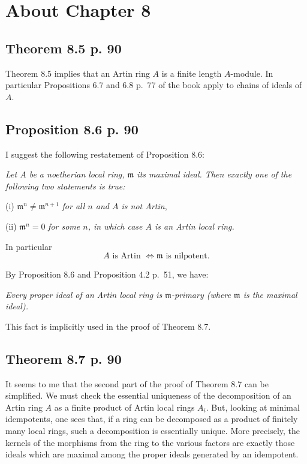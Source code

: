 \documentclass[parskip=half,fontsize=12pt]{scrartcl}%
\newcommand{\mf}{\mathfrak}
\newcommand{\mmm}{\mf m}
\begin{document}
\section{About Chapter 8}%

\subsection{Theorem 8.5 p. 90}\label{8.5}%

Theorem 8.5 implies that an Artin ring $A$ is a finite length $A$-module. In particular Propositions 6.7 and 6.8 p.~77 of the book apply to chains of ideals of $A$.

\subsection{Proposition 8.6 p. 90}\label{8.6}%

I suggest the following restatement of Proposition 8.6:

\emph{Let $A$ be a noetherian local ring, $\mmm$ its maximal ideal. Then exactly one of the following two statements is true:}

(i) $\mmm^n\ne\mmm^{n+1}$ \emph{for all $n$ and $A$ is \emph{not} Artin},

(ii) $\mmm^n=0$ \emph{for some $n$, in which case $A$ is an Artin local ring.}

In particular 
\begin{equation}\label{86}
A\text{ is Artin $\iff\mmm$ is nilpotent.}
\end{equation}%

By Proposition 8.6 and Proposition 4.2 p.~51, we have:

\emph{Every proper ideal of an Artin local ring is $\mmm$-primary (where $\mmm$ is the maximal ideal).} 

This fact is implicitly used in the proof of Theorem 8.7.

\subsection{Theorem 8.7 p. 90}

It seems to me that the second part of the proof of Theorem 8.7 can be simplified. We must check the essential uniqueness of the decomposition of an Artin ring $A$ as a finite product of Artin local rings $A_i$. But, looking at minimal idempotents, one sees that, if a ring can be decomposed as a product of finitely many local rings, such a decomposition is essentially unique. More precisely, the kernels of the morphisms from the ring to the various factors are exactly those ideals which are maximal among the proper ideals generated by an idempotent. %
\end{document}
